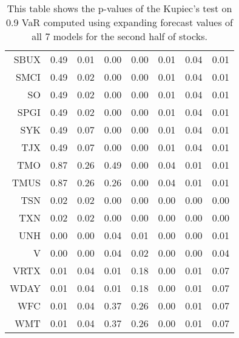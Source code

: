 \begin{table}[ht]
\begin{tabular}{rrrrrrrr}
  SBUX & 0.49 & 0.01 & 0.00 & 0.00 & 0.01 & 0.04 & 0.01 \\ 
  SMCI & 0.49 & 0.02 & 0.00 & 0.00 & 0.01 & 0.04 & 0.01 \\ 
  SO & 0.49 & 0.02 & 0.00 & 0.00 & 0.01 & 0.04 & 0.01 \\ 
  SPGI & 0.49 & 0.02 & 0.00 & 0.00 & 0.01 & 0.04 & 0.01 \\ 
  SYK & 0.49 & 0.07 & 0.00 & 0.00 & 0.01 & 0.04 & 0.01 \\ 
  TJX & 0.49 & 0.07 & 0.00 & 0.00 & 0.01 & 0.04 & 0.01 \\ 
  TMO & 0.87 & 0.26 & 0.49 & 0.00 & 0.04 & 0.01 & 0.01 \\ 
  TMUS & 0.87 & 0.26 & 0.26 & 0.00 & 0.04 & 0.01 & 0.01 \\ 
  TSN & 0.02 & 0.02 & 0.00 & 0.00 & 0.00 & 0.00 & 0.00 \\ 
  TXN & 0.02 & 0.02 & 0.00 & 0.00 & 0.00 & 0.00 & 0.00 \\ 
  UNH & 0.00 & 0.00 & 0.04 & 0.01 & 0.00 & 0.00 & 0.01 \\ 
  V & 0.00 & 0.00 & 0.04 & 0.02 & 0.00 & 0.00 & 0.04 \\ 
  VRTX & 0.01 & 0.04 & 0.01 & 0.18 & 0.00 & 0.01 & 0.07 \\ 
  WDAY & 0.01 & 0.04 & 0.01 & 0.18 & 0.00 & 0.01 & 0.07 \\ 
  WFC & 0.01 & 0.04 & 0.37 & 0.26 & 0.00 & 0.01 & 0.07 \\ 
  WMT & 0.01 & 0.04 & 0.37 & 0.26 & 0.00 & 0.01 & 0.07 \\ 
   \hline
\end{tabular}
\caption[Kupiec's test p-values, alpha =0.9 (2)]{This table shows the p-values of the Kupiec's test on 0.9 VaR computed using expanding forecast values of all 7 models for the second half of stocks.} 
\label{Table:Kupiec_test_expanding_0.9_2}
\end{table}
